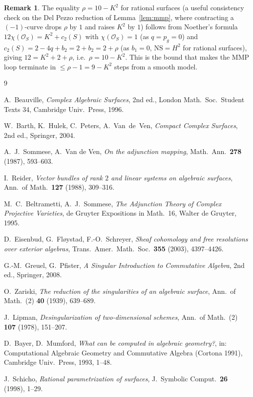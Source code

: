 \documentclass{amsart}
\theoremstyle{plain}
\theoremstyle{definition}
\newtheorem{remark}{Remark}
\newcommand{\cO}{\mathcal{O}}
\begin{document}
\begin{remark}
The equality $\rho=10-K^2$ for rational surfaces (a useful consistency check
on the Del Pezzo reduction of Lemma~\ref{lem:mmp}, where contracting a
$(-1)$-curve drops $\rho$ by $1$ and raises $K^2$ by $1$) follows from Noether's
formula
$12\chi(\cO_S)=K^2+c_2(S)$ with $\chi(\cO_S)=1$ (as $q=p_g=0$) and
$c_2(S)=2-4q+b_2=2+b_2=2+\rho$ (as $b_1=0$, $\mathrm{NS}=H^2$ for rational
surfaces), giving $12=K^2+2+\rho$, i.e.\ $\rho=10-K^2$.  This is the bound that
makes the MMP loop terminate in $\le\rho-1=9-K^2$ steps from a smooth model.
\end{remark}

\begin{thebibliography}{9}

 A.~Beauville, \emph{Complex Algebraic Surfaces},
2nd ed., London Math.\ Soc.\ Student Texts 34, Cambridge Univ.\ Press, 1996.

 W.~Barth, K.~Hulek, C.~Peters, A.~Van~de~Ven,
\emph{Compact Complex Surfaces}, 2nd ed., Springer, 2004.

 A.~J.~Sommese, A.~Van de Ven, \emph{On the adjunction mapping},
Math.\ Ann.\ \textbf{278} (1987), 593--603.

 I.~Reider, \emph{Vector bundles of rank $2$ and linear systems
on algebraic surfaces}, Ann.\ of Math.\ \textbf{127} (1988), 309--316.

 M.~C.~Beltrametti, A.~J.~Sommese,
\emph{The Adjunction Theory of Complex Projective Varieties},
de Gruyter Expositions in Math.\ 16, Walter de Gruyter, 1995.

 D.~Eisenbud, G.~Fl\o ystad, F.-O.~Schreyer,
\emph{Sheaf cohomology and free resolutions over exterior algebras},
Trans.\ Amer.\ Math.\ Soc.\ \textbf{355} (2003), 4397--4426.

 G.-M.~Greuel, G.~Pfister,
\emph{A Singular Introduction to Commutative Algebra},
2nd ed., Springer, 2008.

 O.~Zariski, \emph{The reduction of the singularities of an
algebraic surface}, Ann.\ of Math.\ (2) \textbf{40} (1939), 639--689.

 J.~Lipman, \emph{Desingularization of two-dimensional
schemes}, Ann.\ of Math.\ (2) \textbf{107} (1978), 151--207.

 D.~Bayer, D.~Mumford, \emph{What can be computed in algebraic
geometry?}, in: Computational Algebraic Geometry and Commutative Algebra
(Cortona 1991), Cambridge Univ.\ Press, 1993, 1--48.

 J.~Schicho, \emph{Rational parametrization of surfaces},
J.\ Symbolic Comput.\ \textbf{26} (1998), 1--29.

\end{thebibliography}
\end{document}
